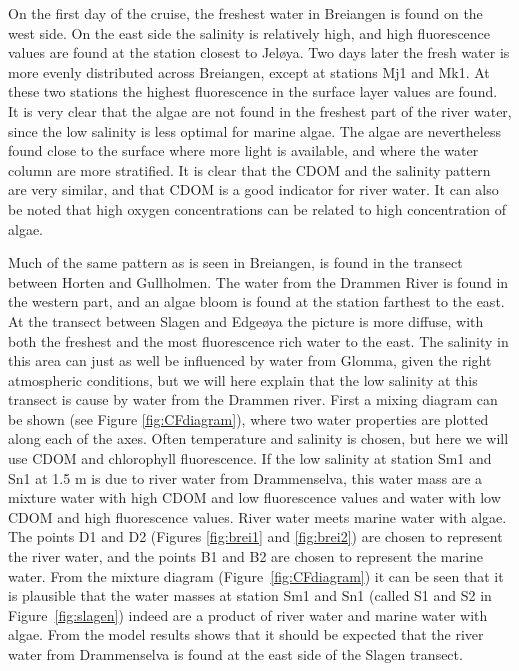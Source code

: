 \documentclass[12pt,a4paper,english]{article}
\begin{document}
On the first day of the cruise, the freshest water in Breiangen is found on the west 
side. On the east side the salinity is relatively high, and high fluorescence 
values are found at the station closest to Jel{\o}ya. 
Two days later the fresh water is more evenly distributed across Breiangen, 
except at stations Mj1 and Mk1. At these two stations the highest fluorescence 
in the surface layer values are found. It is very clear that the algae are not 
found in the freshest part of the river water, since the low salinity is less 
optimal for marine algae. The algae are nevertheless found close to the surface 
where more light is available, and where the water column are more stratified. 
It is clear that the CDOM and the salinity pattern are very similar, and that 
CDOM is a good indicator for river water. It can also be noted that high oxygen 
concentrations can be related to high concentration of algae. 

Much of the same pattern as is seen in Breiangen, is found in the transect 
between Horten and Gullholmen. The water from the Drammen River is found in 
the western part, and an algae bloom is found at the station farthest to the east. 
At the transect between Slagen and Edge{\o}ya the picture is more diffuse, with both 
the freshest and the most fluorescence rich water to the east. 
The salinity in this area can just as well be influenced by water from Glomma, 
given the right atmospheric conditions, but we will here explain that the low 
salinity at this transect is cause by water from the Drammen river. 
First a mixing diagram can be shown (see Figure \ref{fig:CFdiagram}), where two water properties are plotted 
along each of the axes. Often temperature and salinity is chosen, 
but here we will use CDOM and chlorophyll fluorescence. 
If the low salinity at station Sm1 and Sn1 at 1.5 m is due to river water from 
Drammenselva, this water mass are a mixture water with high CDOM and low 
fluorescence values and water with low CDOM and high fluorescence values. 
River water meets marine water with algae. 
The points D1 and D2 (Figures \ref{fig:brei1} and \ref{fig:brei2}) are chosen to 
represent the river water, 
and the points B1 and B2 are chosen to represent the marine water. 
From the mixture diagram (Figure~\ref{fig:CFdiagram}) it can be seen that it is 
plausible that the water masses at station Sm1 and Sn1 
(called S1 and S2 in Figure~\ref{fig:slagen}) indeed are a 
product of river water and marine water with algae. 
From the model results shows that it should be expected that the river 
water from Drammenselva is found at the east side of the Slagen transect. 
\end{document}
